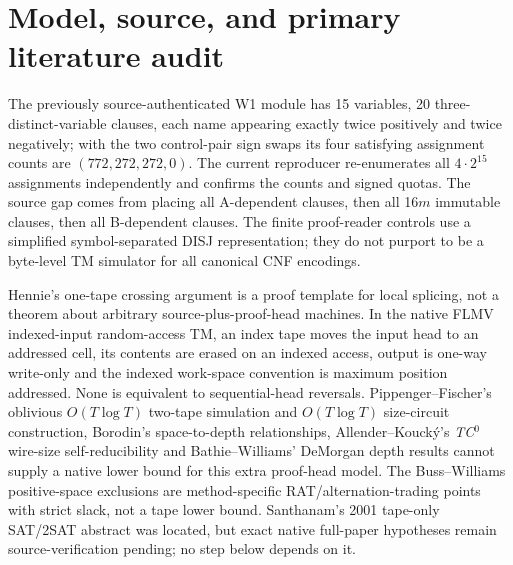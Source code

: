 \documentclass[11pt]{article}
\begin{document}
\section{Model, source, and primary literature audit}
The previously source-authenticated W1 module has 15 variables, 20 three-distinct-variable clauses, each name appearing exactly twice positively and twice negatively; with the two control-pair sign swaps its four satisfying assignment counts are $(772,272,272,0)$. The current reproducer re-enumerates all $4\cdot2^{15}$ assignments independently and confirms the counts and signed quotas. The source gap comes from placing all A-dependent clauses, then all 16$m$ immutable clauses, then all B-dependent clauses. The finite proof-reader controls use a simplified symbol-separated DISJ representation; they do not purport to be a byte-level TM simulator for all canonical CNF encodings.

Hennie's one-tape crossing argument is a proof template for local splicing, not a theorem about arbitrary source-plus-proof-head machines. In the native FLMV indexed-input random-access TM, an index tape moves the input head to an addressed cell, its contents are erased on an indexed access, output is one-way write-only and the indexed work-space convention is maximum position addressed. None is equivalent to sequential-head reversals. Pippenger--Fischer's oblivious $O(T\log T)$ two-tape simulation and $O(T\log T)$ size-circuit construction, Borodin's space-to-depth relationships, Allender--Kouck\'y's \emph{TC}$^0$ wire-size self-reducibility and Bathie--Williams' DeMorgan depth results cannot supply a native lower bound for this extra proof-head model. The Buss--Williams positive-space exclusions are method-specific RAT/alternation-trading points with strict slack, not a tape lower bound. Santhanam's 2001 tape-only SAT/2SAT abstract was located, but exact native full-paper hypotheses remain source-verification pending; no step below depends on it.
\end{document}
